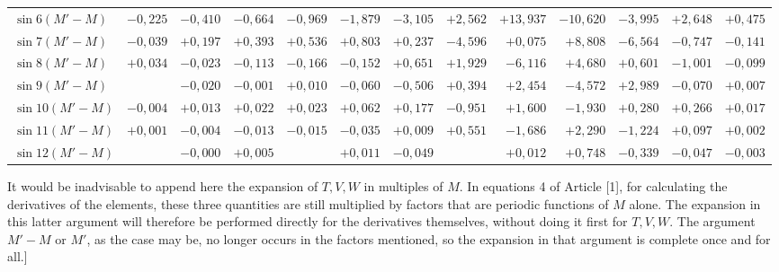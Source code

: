 \begin{landscape}
\begin{longtable}{@{}l|r|r|r|r|r|r|r|r|r|r|r|r@{}}
\(\sin 6(M'-M)\) & \(-0{,}225\) & \(-0{,}410\) & \(-0{,}664\) & \(-0{,}969\) & \(-1{,}879\) & \(-3{,}105\) & \(+2{,}562\) & \(+13{,}937\) & \(-10{,}620\) & \(-3{,}995\) & \(+2{,}648\) & \(+0{,}475\)\\
\(\sin 7(M'-M)\) & \(-0{,}039\) & \(+0{,}197\) & \(+0{,}393\) & \(+0{,}536\) & \(+0{,}803\) & \(+0{,}237\) & \(-4{,}596\) & \(+0{,}075\) & \(+8{,}808\) & \(-6{,}564\) & \(-0{,}747\) & \(-0{,}141\)\\
\(\sin 8(M'-M)\) & \(+0{,}034\) & \(-0{,}023\) & \(-0{,}113\) & \(-0{,}166\) & \(-0{,}152\) & \(+0{,}651\) & \(+1{,}929\) & \(-6{,}116\) & \(+4{,}680\) & \(+0{,}601\) & \(-1{,}001\) & \(-0{,}099\)\\
\(\sin 9(M'-M)\) &  & \(-0{,}020\) & \(-0{,}001\) & \(+0{,}010\) & \(-0{,}060\) & \(-0{,}506\) & \(+0{,}394\) & \(+2{,}454\) & \(-4{,}572\) & \(+2{,}989\) & \(-0{,}070\) & \(+0{,}007\)\\
\(\sin 10(M'-M)\) & \(-0{,}004\) & \(+0{,}013\) & \(+0{,}022\) & \(+0{,}023\) & \(+0{,}062\) & \(+0{,}177\) & \(-0{,}951\) & \(+1{,}600\) & \(-1{,}930\) & \(+0{,}280\) & \(+0{,}266\) & \(+0{,}017\)\\
\(\sin 11(M'-M)\) & \(+0{,}001\) & \(-0{,}004\) & \(-0{,}013\) & \(-0{,}015\) & \(-0{,}035\) & \(+0{,}009\) & \(+0{,}551\) & \(-1{,}686\) & \(+2{,}290\) & \(-1{,}224\) & \(+0{,}097\) & \(+0{,}002\)\\
\(\sin 12(M'-M)\) &  & \(-0{,}000\) & \(+0{,}005\) &  & \(+0{,}011\) & \(-0{,}049\) &  & \(+0{,}012\) & \(+0{,}748\) & \(-0{,}339\) & \(-0{,}047\) & \(-0{,}003\)\\
\end{longtable}
\fontsize{10}{13}\selectfont
It would be inadvisable to append here the expansion of \(T, V, W\) in multiples of \(M\).
In equations 4 of Article [1], for calculating the
derivatives of the elements, these three quantities are still multiplied by factors
that are periodic functions of \(M\) alone. The expansion in this
latter argument will therefore be performed directly for the derivatives themselves, without doing it first for \(T, V, W\).
The argument \(M'-M\) or \(M'\), as the case may be, no longer occurs in the factors
mentioned, so the expansion in that argument is complete once and for all.]
\clearpage
\endgroup
\end{landscape}
